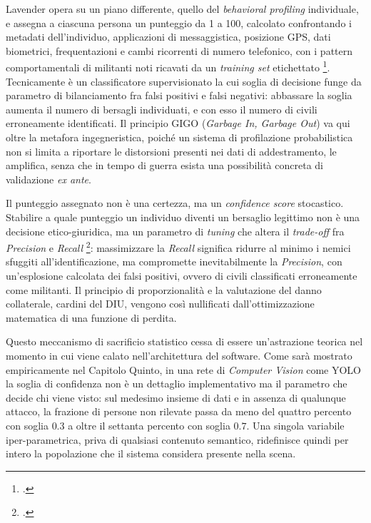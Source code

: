 \documentclass[a4paper,12pt]{report}
\begin{document}
Lavender opera su un piano differente, quello del \textit{behavioral profiling}
individuale, e assegna a ciascuna persona un punteggio da 1 a 100, calcolato
confrontando i metadati dell'individuo, applicazioni di messaggistica, posizione
GPS, dati biometrici, frequentazioni e cambi ricorrenti di numero telefonico, con
i pattern comportamentali di militanti noti ricavati da un \textit{training set}
etichettato \footcite{abraham_2024_lavender}. Tecnicamente è un classificatore
supervisionato la cui soglia di decisione funge da parametro di bilanciamento fra
falsi positivi e falsi negativi: abbassare la soglia aumenta il numero di
bersagli individuati, e con esso il numero di civili erroneamente identificati.
Il principio GIGO (\textit{Garbage In, Garbage Out}) va qui oltre la metafora
ingegneristica, poiché un sistema di profilazione probabilistica non si limita a
riportare le distorsioni presenti nei dati di addestramento, le amplifica, senza
che in tempo di guerra esista una possibilità concreta di validazione
\textit{ex ante}.

Il punteggio assegnato non è una certezza, ma un \textit{confidence score}
stocastico. Stabilire a quale punteggio un individuo diventi un bersaglio
legittimo non è una decisione etico-giuridica, ma un parametro di \textit{tuning}
che altera il \textit{trade-off} fra \textit{Precision} e \textit{Recall}
\footcite{podar_2025}: massimizzare la \textit{Recall} significa ridurre al minimo
i nemici sfuggiti all'identificazione, ma compromette inevitabilmente la
\textit{Precision}, con un'esplosione calcolata dei falsi positivi, ovvero di
civili classificati erroneamente come militanti. Il principio di proporzionalità e
la valutazione del danno collaterale, cardini del DIU, vengono così nullificati
dall'ottimizzazione matematica di una funzione di perdita.

Questo meccanismo di sacrificio statistico cessa di essere un'astrazione teorica
nel momento in cui viene calato nell'architettura del software. Come sarà
mostrato empiricamente nel Capitolo Quinto, in una rete di \textit{Computer
Vision} come YOLO la soglia di confidenza non è un dettaglio implementativo ma il
parametro che decide chi viene visto: sul medesimo insieme di dati e in assenza
di qualunque attacco, la frazione di persone non rilevate passa da meno del
quattro percento con soglia $0.3$ a oltre il settanta percento con soglia $0.7$.
Una singola variabile iper-parametrica, priva di qualsiasi contenuto semantico,
ridefinisce quindi per intero la popolazione che il sistema considera presente
nella scena.
\end{document}
